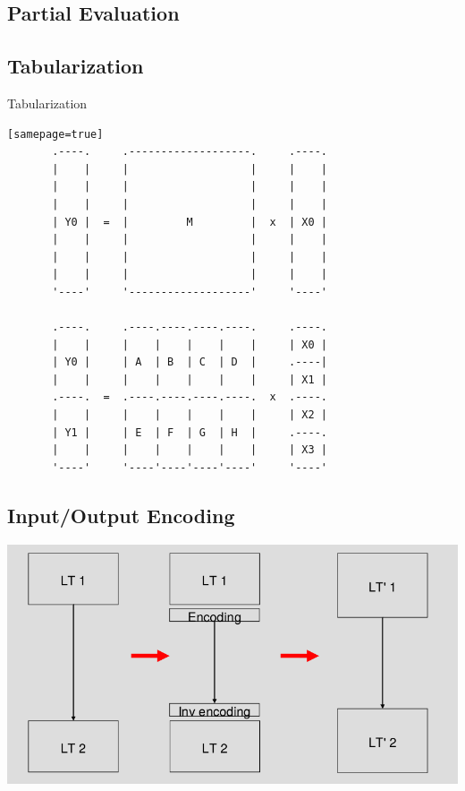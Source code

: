 \documentclass{beamer}
\begin{document}
\subsection{Partial Evaluation}

\subsection{Tabularization}{Tabularization}

\begin{frame}[fragile] 

\begin{Verbatim}[scale=0.5][samepage=true]
       .----.     .-------------------.     .----.
       |    |     |                   |     |    |
       |    |     |                   |     |    |
       |    |     |                   |     |    |
       | Y0 |  =  |         M         |  x  | X0 |
       |    |     |                   |     |    |
       |    |     |                   |     |    |
       |    |     |                   |     |    |
       '----'     '-------------------'     '----'

       .----.     .----.----.----.----.     .----.
       |    |     |    |    |    |    |     | X0 |
       | Y0 |     | A  | B  | C  | D  |     .----|
       |    |     |    |    |    |    |     | X1 |
       .----.  =  .----.----.----.----.  x  .----.
       |    |     |    |    |    |    |     | X2 |
       | Y1 |     | E  | F  | G  | H  |     .----.
       |    |     |    |    |    |    |     | X3 |
       '----'     '----'----'----'----'     '----'
\end{Verbatim}

\end{frame}

\subsection{Input/Output Encoding}

\begin{frame}
\includegraphics[scale=0.50]{images/encoding.png}
\end{frame}
\end{document}
